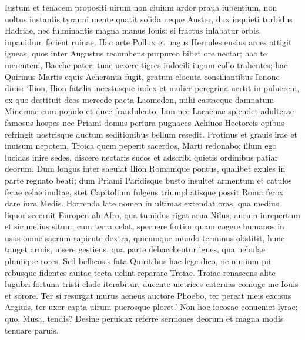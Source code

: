 \documentclass{book}
\newenvironment {carmen} [1] [\relax] 
  {\Titulus \Versus \incipit*\numerus{1}#1}
  {\endVersus}
\newcommand {\Alcaic}    {\Forma \strophae {0 \poena 01 \poena 2}}
\begin{document}
\begin{carmen}[\Alcaic]


Iustum et tenacem propositi uirum
 non ciuium ardor praua iubentium,
      non uoltus instantis tyranni
      mente quatit solida neque Auster, 
dux inquieti turbidus Hadriae,               
 nec fulminantis magna manus Iouis:
      si fractus inlabatur orbis,
      inpauidum ferient ruinae. 
Hac arte Pollux et uagus Hercules
 ensius arces attigit igneas,               
      quos inter Augustus recumbens
      purpureo bibet ore nectar; 
hac te merentem, Bacche pater, tuae
 uexere tigres indocili iugum
      collo trahentes; hac Quirinus
      Martis equis Acheronta fugit,                
gratum elocuta consiliantibus
 Ionone diuis: `Ilion, Ilion
      fatalis incestusque iudex
      et mulier peregrina uertit                
in puluerem, ex quo destituit deos
 mercede pacta Laomedon, mihi
      castaeque damnatum Mineruae
      cum populo et duce fraudulento. 
Iam nec Lacaenae splendet adulterae               
 famosus hospes nec Priami domus
      periura pugnaces Achiuos
      Hectoreis opibus refringit 
nostrisque ductum seditionibus
 bellum resedit. Protinus et grauis               
      irae et inuisum nepotem,
      Troica quem peperit sacerdos, 
Marti redonabo; illum ego lucidas
 inire sedes, discere nectaris
      sucos et adscribi quietis
      ordinibus patiar deorum.                
Dum longus inter saeuiat Ilion
 Romamque pontus, qualibet exules
      in parte regnato beati;
      dum Priami Paridisque busto                
insultet armentum et catulos ferae
 celae inultae, stet Capitolium
      fulgens triumphatisque possit
      Roma ferox dare iura Medis. 
Horrenda late nomen in ultimas               
 extendat oras, qua medius liquor
      secernit Europen ab Afro,
      qua tumidus rigat arua Nilus; 
aurum inrepertum et sic melius situm,
 cum terra celat, spernere fortior               
      quam cogere humanos in usus
      omne sacrum rapiente dextra, 
quicumque mundo terminus obstitit,
 hunc tanget armis, uisere gestiens,
      qua parte debacchentur ignes,
      qua nebulae pluuiique rores.                
Sed bellicosis fata Quiritibus
 hac lege dico, ne nimium pii
      rebusque fidentes auitae
      tecta uelint reparare Troiae.                
Troiae renascens alite lugubri
 fortuna tristi clade iterabitur,
      ducente uictrices cateruas
      coniuge me Iouis et sorore. 
Ter si resurgat murus aeneus               
 auctore Phoebo, ter pereat meis
      excisus Argiuis, ter uxor
      capta uirum puerosque ploret.' 
Non hoc iocosae conueniet lyrae;
 quo, Musa, tendis? Desine peruicax               
      referre sermones deorum et
      magna modis tenuare paruis. 

\end{carmen}
\end{document}
